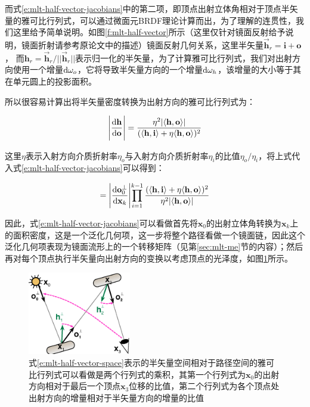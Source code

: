 而式\ref{e:mlt-half-vector-jacobians}中的第二项，即顶点出射立体角相对于顶点半矢量的雅可比行列式，可以通过微面元BRDF理论\cite{a:RobustMonteCarloMethodsforLightTransportSimulation}计算而出，为了理解的连贯性，我们这里给予简单说明。如图\ref{f:mlt-half-vector}所示（这里仅针对镜面反射给予说明，镜面折射请参考原论文中的描述）镜面反射几何关系，这里半矢量$\vec{\mathbf{h}}_r = \mathbf{i} + \mathbf{o}$， 而$\mathbf{h}_r = \vec{\mathbf{h}}_r / ||\vec{\mathbf{h}}_r||$表示归一化的半矢量，为了计算雅可比行列式，我们对出射方向使用一个增量${\rm d}\omega_o$，它将导致半矢量方向的一个增量${\rm d}\omega_h$，该增量的大小等于其在单元圆上的投影面积。

所以很容易计算出将半矢量密度转换为出射方向的雅可比行列式为：

\begin{equation}
	\Bigg|\frac{{\rm d}\mathbf{h}}{{\rm d}\mathbf{o}}\Bigg|=\frac{\eta^{2}|\langle\mathbf{h},\mathbf{o}\rangle|}{(\langle\mathbf{h},\mathbf{i}\rangle+\eta\langle\mathbf{h},\mathbf{o}\rangle)^{2}}
\end{equation}

这里$\eta$表示入射方向介质折射率$\eta_o$与入射方向介质折射率$\eta_i$的比值$\eta_o/\eta_i$，将上式代入式\ref{e:mlt-half-vector-jacobians}可以得到：

\begin{equation}\label{e:mlt-half-vector-space-jacobian}
	=\Biggl|\frac{{\rm d}\mathbf{o}^{\perp}_0}{{\rm d}\mathbf{x}_k}\Biggl|\prod^{k-1}_{i=1}\frac{(\langle\mathbf{h},\mathbf{i}\rangle+\eta\langle\mathbf{h},\mathbf{o}\rangle)^{2}}{\eta^{2}|\langle\mathbf{h},\mathbf{o}\rangle|}
\end{equation}

因此，式\ref{e:mlt-half-vector-jacobians}可以看做首先将$\mathbf{x}_0$的出射立体角转换为$\mathbf{x}_k$上的面积密度，这是一个泛化几何项，这一步将整个路径看做一个镜面链，因此这个泛化几何项表现为镜面流形上的一个转移矩阵（见第\ref{sec:mlt-me}节的内容）；然后再对每个顶点执行半矢量向出射方向的变换以考虑顶点的光泽度，如图\ref{f:mlt-half-vector-space-jacobians}所示。

\begin{figure}
	\sidecaption
	\includegraphics[width=0.4\textwidth]{figures/mlt/half-vector-space-jacobians}
	\caption{式\ref{e:mlt-half-vector-space}表示的半矢量空间相对于路径空间的雅可比行列式可以看做是两个行列式的乘积，其第一个行列式为$\mathbf{x}_0$的出射方向相对于最后一个顶点$\mathbf{x}_3$位移的比值，第二个行列式为各个顶点处出射方向的增量相对于半矢量方向的增量的比值}
	\label{f:mlt-half-vector-space-jacobians}
\end{figure}




